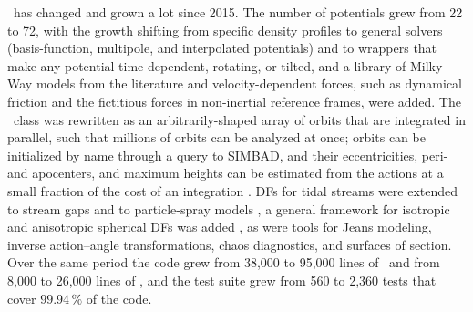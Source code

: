 \galpy\ has changed and grown a lot since 2015.
The number of potentials grew from 22 to 72, with the growth
shifting from specific density profiles to general solvers (basis-function,
multipole, and interpolated potentials) and to wrappers that make any
potential time-dependent, rotating, or tilted, and a library of
Milky-Way models from the literature and velocity-dependent forces,
such as dynamical friction and the fictitious forces in non-inertial
reference frames, were added. The
\orb\ class was rewritten as an arbitrarily-shaped array of orbits that
are integrated in parallel, such that millions of orbits can be analyzed
at once; orbits can be initialized by name through a query to SIMBAD,
and their eccentricities, peri- and apocenters, and maximum heights can
be estimated from the actions at a small fraction of the cost of an
integration \citep{MackerethBovy2018}. DFs for tidal streams were extended to stream gaps
\citep{Sanders2016} and to particle-spray models \citep[][implemented
in \galpy\ by \citealt{Qian2022}]{Fardal2015,Chen2025}, a general
framework for isotropic and anisotropic spherical DFs was added
\citep{Lane2022}, as were tools for Jeans modeling, inverse
action--angle transformations, chaos diagnostics, and surfaces of
section. Over the same period the code grew from 38,000 to 95,000 lines
of \python\ and from 8,000 to 26,000 lines of \cc, and the test suite
grew from 560 to 2,360 tests that cover $99.94\,\%$ of the code.

